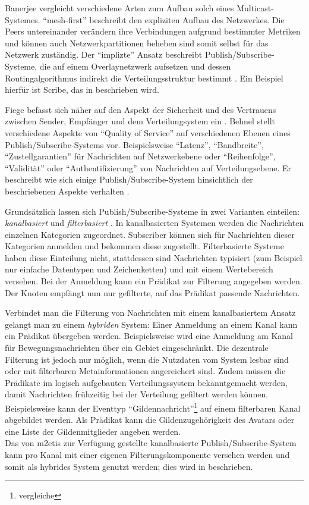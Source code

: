 Banerjee vergleicht verschiedene Arten zum Aufbau solch eines Multicast-Systemes. \enquote{mesh-first} beschreibt den expliziten Aufbau des Netzwerkes. Die Peers untereinander verändern ihre Verbindungen aufgrund bestimmter Metriken und können auch Netzwerkpartitionen beheben sind somit selbst für das Netzwerk zuständig. Der \enquote{implizte} Ansatz beschreibt Publish/Subscribe-Systeme, die auf einem Overlaynetzwerk aufsetzen und dessen Routingalgorithmus indirekt die Verteilungsstruktur bestimmt \cite{Banerjee2001Comparative}. Ein Beispiel hierfür ist Scribe, das in  beschrieben wird.

Fiege befasst sich näher auf den Aspekt der Sicherheit und des Vertrauens zwischen Sender, Empfänger und dem Verteilungsystem ein \cite{FiegeSecurity}. Behnel stellt verschiedene Aspekte von \enquote{Quality of Service} auf verschiedenen Ebenen eines Publish/Subscribe-Systems vor. Beispielsweise \enquote{Latenz}, \enquote{Bandbreite}, \enquote{Zustellgarantien} für Nachrichten auf Netzwerkebene oder \enquote{Reihenfolge}, \enquote{Validität} oder \enquote{Authentifizierung} von Nachrichten auf Verteilungsebene. Er beschreibt wie sich einige Publish/Subscribe-System hinsichtlich der beschriebenen Aspekte verhalten \cite{BeFiMu2006PubSubQoS}. 

Grundsätzlich lassen sich Publish/Subscribe-Systeme in zwei Varianten einteilen: \emph{kanalbasiert} und \emph{filterbasiert} \cite{Liu2003Survey}. In kanalbasierten Systemen werden die Nachrichten einzelnen Kategorien zugeordnet. Subscriber können sich für Nachrichten dieser Kategorien anmelden und bekommen diese zugestellt. Filterbasierte Systeme haben diese Einteilung nicht, stattdessen sind Nachrichten typisiert (zum Beispiel nur einfache Datentypen und Zeichenketten) und mit einem Wertebereich versehen. Bei der Anmeldung kann ein Prädikat zur Filterung angegeben werden. Der Knoten empfängt nun nur gefilterte, auf das Prädikat passende Nachrichten.

Verbindet man die Filterung von Nachrichten mit einem kanalbasiertem Ansatz gelangt man zu einem \emph{hybriden} System: Einer Anmeldung an einem Kanal kann ein Prädikat übergeben werden. Beispielsweise wird eine Anmeldung am Kanal für Bewegungsnachrichten über ein Gebiet eingeschränkt. Die dezentrale Filterung ist jedoch nur möglich, wenn die Nutzdaten vom System lesbar sind oder mit filterbaren Metainformationen angereichert sind. Zudem müssen die Prädikate im logisch aufgebauten Verteilungssystem bekanntgemacht werden, damit Nachrichten frühzeitig bei der Verteilung gefiltert werden können. Beispielsweise kann der Eventtyp \enquote{Gildennachricht}\footnote{vergleiche } auf einem filterbaren Kanal abgebildet werden. Als Prädikat kann die Gildenzugehörigkeit des Avatars oder eine Liste der Gildenmitglieder angeben werden.\\
Das von \ac{m2etis} zur Verfügung gestellte kanalbasierte Publish/Subscribe-System kann pro Kanal mit einer eigenen Filterungskomponente versehen werden und somit als hybrides System genutzt werden; dies wird in  beschrieben.

